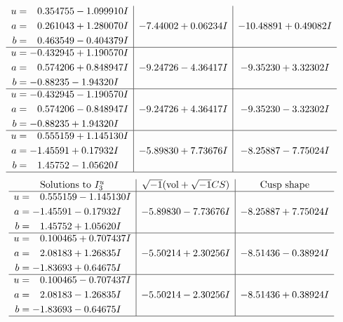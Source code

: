 \documentclass[1p]{elsarticle_modified}
\theoremstyle{definition}
\newcommand{\I}{\sqrt{-1}}
\begin{document}
$$\begin{array}{c|c|c}
\begin{aligned}
u &= \phantom{-}0.354755 - 1.099910 I \\
a &= \phantom{-}0.261043 + 1.280070 I \\
b &= \phantom{-}0.463549 - 0.404379 I\end{aligned}
 & -7.44002 + 0.06234 I & -10.48891 + 0.49082 I \\ \hline\begin{aligned}
u &= -0.432945 + 1.190570 I \\
a &= \phantom{-}0.574206 + 0.848947 I \\
b &= -0.88235 - 1.94320 I\end{aligned}
 & -9.24726 - 4.36417 I & -9.35230 + 3.32302 I \\ \hline\begin{aligned}
u &= -0.432945 - 1.190570 I \\
a &= \phantom{-}0.574206 - 0.848947 I \\
b &= -0.88235 + 1.94320 I\end{aligned}
 & -9.24726 + 4.36417 I & -9.35230 - 3.32302 I \\ \hline\begin{aligned}
u &= \phantom{-}0.555159 + 1.145130 I \\
a &= -1.45591 + 0.17932 I \\
b &= \phantom{-}1.45752 - 1.05620 I\end{aligned}
 & -5.89830 + 7.73676 I & -8.25887 - 7.75024 I\\
 \hline 
 \end{array}$$\newpage$$\begin{array}{c|c|c}  
\text{Solutions to }I^u_{3}& \I (\text{vol} + \sqrt{-1}CS) & \text{Cusp shape}\\
 \hline 
\begin{aligned}
u &= \phantom{-}0.555159 - 1.145130 I \\
a &= -1.45591 - 0.17932 I \\
b &= \phantom{-}1.45752 + 1.05620 I\end{aligned}
 & -5.89830 - 7.73676 I & -8.25887 + 7.75024 I \\ \hline\begin{aligned}
u &= \phantom{-}0.100465 + 0.707437 I \\
a &= \phantom{-}2.08183 + 1.26835 I \\
b &= -1.83693 + 0.64675 I\end{aligned}
 & -5.50214 + 2.30256 I & -8.51436 - 0.38924 I \\ \hline\begin{aligned}
u &= \phantom{-}0.100465 - 0.707437 I \\
a &= \phantom{-}2.08183 - 1.26835 I \\
b &= -1.83693 - 0.64675 I\end{aligned}
 & -5.50214 - 2.30256 I & -8.51436 + 0.38924 I\\
 \hline 
 \end{array}$$\newpage\newpage\renewcommand{\arraystretch}{1}
\end{document}
